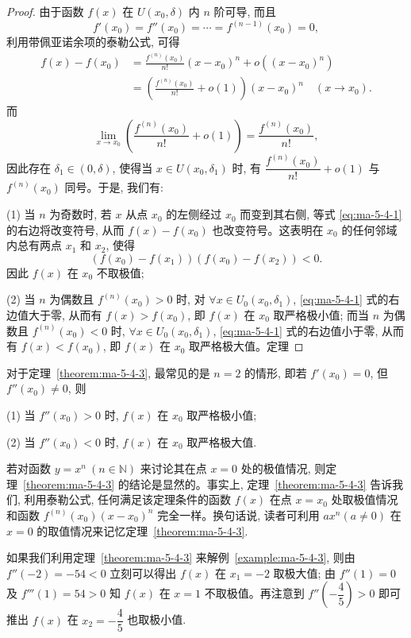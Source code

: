 \begin{proof}
由于函数 $f(x)$ 在 $U(x_0,\delta)$ 内 $n$ 阶可导, 而且
\[
  f'(x_0)=f''(x_0)=\cdots=f^{(n-1)}(x_0)=0,
\]
利用带佩亚诺余项的泰勒公式, 可得
\begin{equation}
\begin{aligned}
  f(x)-f(x_0)
  &=\frac{f^{(n)}(x_0)}{n!}(x-x_0)^n+o((x-x_0)^n)\\
  &=\left(\frac{f^{(n)}(x_0)}{n!}+o(1)\right)(x-x_0)^n\quad (x\to x_0).
\end{aligned}
\label{eq:ma-5-4-1}
\end{equation}
而
\[
  \lim_{x\to x_0}\left(\frac{f^{(n)}(x_0)}{n!}+o(1)\right)
  =\frac{f^{(n)}(x_0)}{n!},
\]
因此存在 $\delta_1\in(0,\delta)$, 使得当 $x\in U(x_0,\delta_1)$ 时, 有 $\dfrac{f^{(n)}(x_0)}{n!}+o(1)$ 与 $f^{(n)}(x_0)$ 同号。于是, 我们有:

(1) 当 $n$ 为奇数时, 若 $x$ 从点 $x_0$ 的左侧经过 $x_0$ 而变到其右侧, 等式 \eqref{eq:ma-5-4-1} 的右边将改变符号, 从而 $f(x)-f(x_0)$ 也改变符号。这表明在 $x_0$ 的任何邻域内总有两点 $x_1$ 和 $x_2$, 使得
\[
  (f(x_0)-f(x_1))(f(x_0)-f(x_2))<0.
\]
因此 $f(x)$ 在 $x_0$ 不取极值;

(2) 当 $n$ 为偶数且 $f^{(n)}(x_0)>0$ 时, 对 $\forall x\in U_0(x_0,\delta_1)$, \eqref{eq:ma-5-4-1} 式的右边值大于零, 从而有 $f(x)>f(x_0)$, 即 $f(x)$ 在 $x_0$ 取严格极小值; 而当 $n$ 为偶数且 $f^{(n)}(x_0)<0$ 时, $\forall x\in U_0(x_0,\delta_1)$, \eqref{eq:ma-5-4-1} 式的右边值小于零, 从而有 $f(x)<f(x_0)$, 即 $f(x)$ 在 $x_0$ 取严格极大值。定理
\end{proof}


\begin{remark}\label{remark:ma-5-source-113}
对于定理~\ref{theorem:ma-5-4-3}, 最常见的是 $n=2$ 的情形, 即若 $f'(x_0)=0$, 但 $f''(x_0)\ne0$, 则

(1) 当 $f''(x_0)>0$ 时, $f(x)$ 在 $x_0$ 取严格极小值;

(2) 当 $f''(x_0)<0$ 时, $f(x)$ 在 $x_0$ 取严格极大值.
\end{remark}

若对函数 $y=x^n\ (n\in\mathbb{N})$ 来讨论其在点 $x=0$ 处的极值情况, 则定理~\ref{theorem:ma-5-4-3} 的结论是显然的。事实上, 定理~\ref{theorem:ma-5-4-3} 告诉我们, 利用泰勒公式, 任何满足该定理条件的函数 $f(x)$ 在点 $x=x_0$ 处取极值情况和函数 $f^{(n)}(x_0)(x-x_0)^n$ 完全一样。换句话说, 读者可利用 $ax^n(a\ne0)$ 在 $x=0$ 的取值情况来记忆定理~\ref{theorem:ma-5-4-3}.

如果我们利用定理~\ref{theorem:ma-5-4-3} 来解例~\ref{example:ma-5-4-3}, 则由 $f''(-2)=-54<0$ 立刻可以得出 $f(x)$ 在 $x_1=-2$ 取极大值; 由 $f''(1)=0$ 及 $f'''(1)=54>0$ 知 $f(x)$ 在 $x=1$ 不取极值。再注意到 $f''\left(-\dfrac45\right)>0$ 即可推出 $f(x)$ 在 $x_2=-\dfrac45$ 也取极小值.

